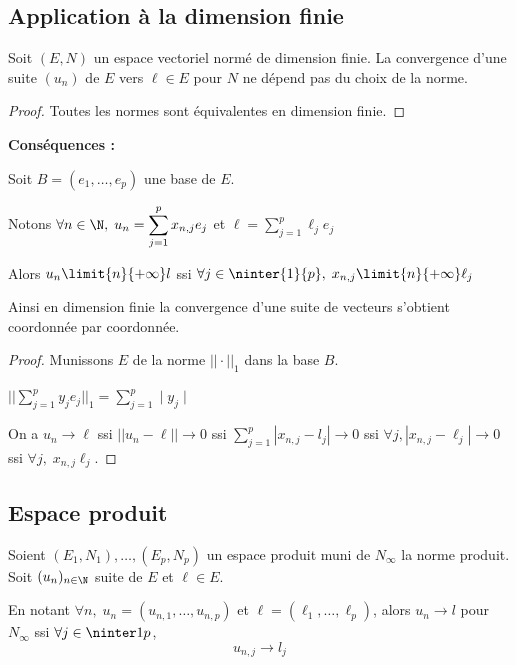 \subsection{Application à la dimension finie}

\begin{theoreme}{}{}
    Soit $(E, N)$ un espace vectoriel normé de dimension finie. La convergence d'une suite $(u_n)$ de $E$
    vers $\ell \in E$ pour $N$ ne dépend pas du choix de la norme. 
\end{theoreme}

\begin{proof}
    Toutes les normes sont équivalentes en dimension finie. 
\end{proof}

\textbf{Conséquences :}

Soit $B = (e_1, \dots, e_p)$ une base de $E$.

Notons $\displaystyle  \forall n \in \N, \; u_n = \sum_{j = 1}^{p} x_{n, j} e_j$
et $\displaystyle \ell = \sum_{j = 1}^{p} \ell_j e_j$

Alors $u_n \limit{n}{+ \infty} l$ ssi $\forall j \in \ninter{1}{p}, \; x_{n, j} \limit{n}{+ \infty} \ell_j$

Ainsi en dimension finie la convergence d'une suite de vecteurs s'obtient coordonnée par coordonnée. 


\begin{proof}
    Munissons $E$ de la norme $||\cdot||_1$ dans la base $B$. 

    $\displaystyle || \sum_{j =  1}^{p} y_je_j||_1 = \sum_{j = 1}^{p }\mid y_j\mid$

    On a $u_n \to \ell$ ssi $|| u_n - \ell|| \to 0$ ssi 
    $\displaystyle \sum_{j = 1}^{p }|x_{n, j} - l_j| \to 0$ ssi 
    $\forall j, |x_{n, j} - \ell_j| \to 0$ ssi $\forall j, \; x_{n, j} \ell_j$. 
\end{proof}

\subsection{Espace produit}

\begin{definition}{}{}
    Soient $(E_1, N_1), \dots, (E_p, N_p)$ un espace produit muni de $N_\infty$ la norme produit. 
    Soit $(u_n)_{n \in \N}$ suite de $E$ et $\ell \in E$.

    En notant $\forall n, \; u_n = (u_{n, 1}, \dots, u_{n, p})$ et $\ell = (\ell_1, \dots, \ell_p)$, 
    alors $u_n \to l$ pour $N_\infty$ ssi $\forall j \in \ninter 1 p$, 
    $$u_{n, j} \to l_j$$
\end{definition}


